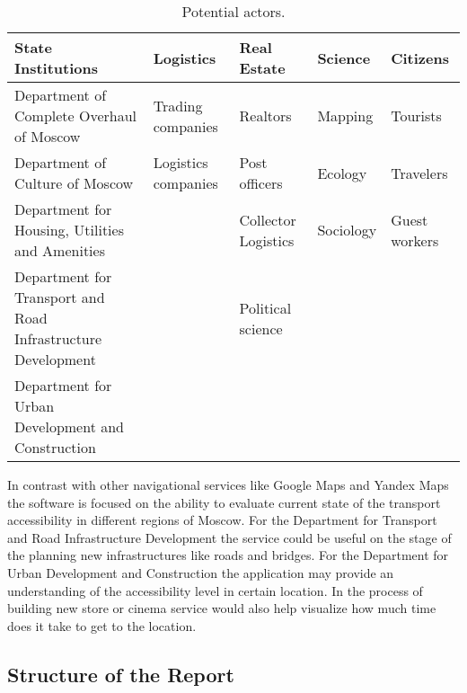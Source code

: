 \begin{table}[ht]
  \renewcommand{\arraystretch}{1.5}
  \centering
  \footnotesize
  \begin{tabular}{p{4cm} p{2.5cm} p{2.5cm} p{1.5cm} p{2.2cm}}
    \hline
    \textbf{State Institutions} & \textbf{Logistics} &\textbf{Real Estate}
    & \textbf{Science} & \textbf{Citizens} \\
    \hline

    Department of Complete Overhaul of Moscow &
    Trading companies &
    Realtors &
    Mapping &
    Tourists \\


    Department of Culture of Moscow &
    Logistics companies &
    Post officers &
    Ecology &
    Travelers  \\


    Department for Housing, Utilities and Amenities &
    &
    Collector Logistics &
    Sociology &
    Guest workers \\


    Department for Transport and Road Infrastructure Development
    &
    &
    Political science &
    \\


    Department for Urban Development and Construction &
    &
    &
    &
    \\

    \hline
  \end{tabular}

  \caption{Potential actors.}
  \label{tab:actors}
\end{table}

In contrast with other navigational services like Google Maps and Yandex Maps the software is
focused on the ability to evaluate current state of the transport accessibility in different regions
of Moscow. For the Department for Transport and Road Infrastructure Development the service could be
useful on the stage of the planning new infrastructures like roads and bridges. For the Department for
Urban Development and Construction the application may provide an understanding of the
accessibility level in certain location. In the process of building new store or cinema service
would also help visualize how much time does it take to get to the location.

\subsection{Structure of the Report}

